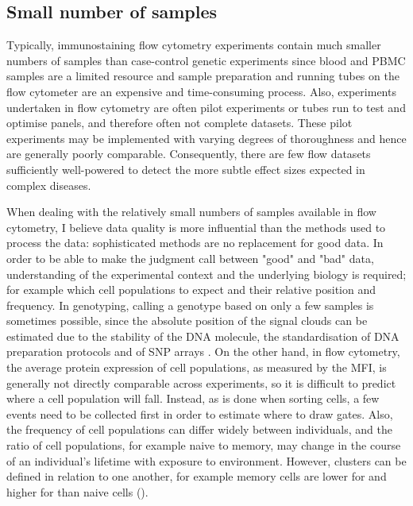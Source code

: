 \subsection{ Small number of samples }

Typically, immunostaining flow cytometry experiments contain much smaller numbers of samples than case-control genetic experiments since blood and \gls{PBMC} samples are a limited resource and sample preparation and running tubes on the flow cytometer are an expensive and time-consuming process.
Also, experiments undertaken in flow cytometry are often pilot experiments or tubes run to test and optimise panels, and therefore often not complete datasets.
These pilot experiments may be implemented with varying degrees of thoroughness and hence are generally poorly comparable.
Consequently, there are few flow datasets sufficiently well-powered to detect the more subtle effect sizes expected in complex diseases.

When dealing with the relatively small numbers of samples available in flow cytometry, I believe data quality is more influential than the methods used to process the data: sophisticated methods are no replacement for good data.
In order to be able to make the judgment call between "good" and "bad" data, understanding of the experimental context and the underlying biology is required; for example which cell populations to expect and their relative position and frequency.
In genotyping, calling a genotype based on only a few samples is sometimes possible, since the absolute position of the signal clouds can be estimated due to the stability of the DNA molecule, the standardisation of DNA preparation protocols and of SNP arrays \citep{Di:2005uj,Giannoulatou:2008ty}.
On the other hand, in flow cytometry, the average protein expression of cell populations, as measured by the \gls{MFI}, is generally not directly comparable across experiments, so it is difficult to predict where a cell population will fall.
Instead, as is done when sorting cells, a few events need to be collected first in order to estimate where to draw gates.
Also, the frequency of cell populations can differ widely between individuals, and the ratio of cell populations, for example naive to memory, may change in the course of an individual's lifetime with exposure to environment. 
However, clusters can be defined in relation to one another, for example memory cells are lower for  and higher for  than naive cells ().

